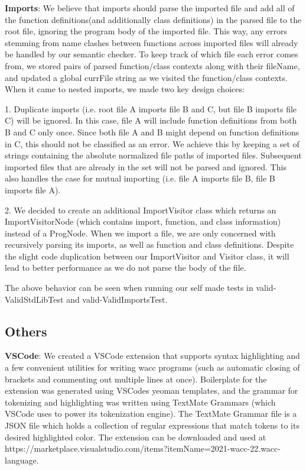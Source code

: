 \documentclass[11pt,a4paper]{article}
\begin{document}
\noindent \textbf{Imports}: We believe that imports should parse the imported file and add all of the function definitions(and additionally class definitions) in the parsed file to the root file, ignoring the program body of the imported file. This way, any errors stemming from name clashes between functions across imported files will already be handled by our semantic checker. To keep track of which file each error comes from, we stored pairs of parsed function/class contexts along with their fileName, and updated a global currFile string as we visited the function/class contexts. When it came to nested imports, we made two key design choices:

1. Duplicate imports (i.e. root file A imports file B and C, but file B imports file C) will be ignored. In this case, file A will include function definitions from both B and C only once. Since both file A and B might depend on function definitions in C, this should not be classified as an error. We achieve this by keeping a set of strings containing the absolute normalized file paths of imported files. Subsequent imported files that are already in the set will not be parsed and ignored. This also handles the case for mutual importing (i.e. file A imports file B, file B imports file A). 

2. We decided to create an additional ImportVisitor class which returns an ImportVisitorNode (which contains import, function, and class information) instead of a ProgNode. When we import a file, we are only concerned with recursively parsing its imports, as well as function and class definitions. Despite the slight code duplication between our ImportVisitor and Visitor class, it will lead to better performance as we do not parse the body of the file. 

The above behavior can be seen when running our self made tests in valid-ValidStdLibTest and valid-ValidImportsTest.



\subsection{Others}
\noindent \textbf{VSCode}: We created a VSCode extension that supports syntax highlighting and a few convenient utilities for writing wacc programs (such as automatic closing of brackets and commenting out multiple lines at once). Boilerplate for the extension was generated using VSCodes yeoman templates, and the grammar for tokenizing and highlighting was written using TextMate Grammars (which VSCode uses to power its tokenization engine). The TextMate Grammar file is a JSON file which holds a collection of regular expressions that match tokens to its desired highlighted color. The extension can be downloaded and used at https://marketplace.visualstudio.com/items?itemName=2021-wacc-22.wacc-language.
\end{document}
